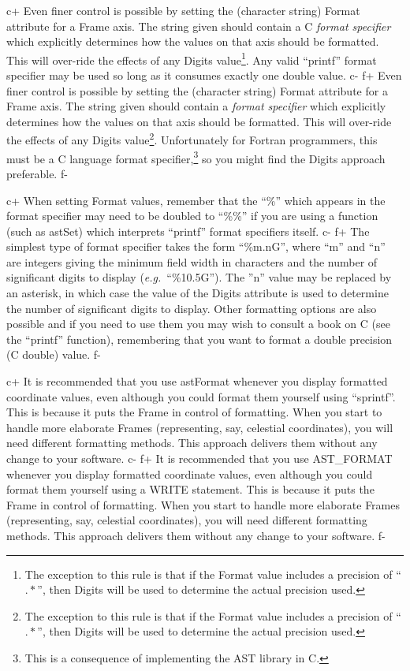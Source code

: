 \documentclass[twoside,11pt]{starlink}
\begin{document}
c+
Even finer control is possible by setting the (character string) Format
attribute for a Frame axis. The string given should contain a C
\emph{format specifier} which explicitly determines how the values on
that axis should be formatted. This will over-ride the effects of any
Digits value\footnote{The exception to this rule is that if the Format
value includes a precision of ``$.*$'', then Digits will be used to
determine the actual precision used.}. Any valid ``printf'' format
specifier may be used so long as it consumes exactly one double value.
c-
f+
Even finer control is possible by setting the (character string)
Format attribute for a Frame axis. The string given should contain a
\emph{format specifier} which explicitly determines how the values on
that axis should be formatted. This will over-ride the effects of any
Digits value\footnote{The exception to this rule is that if the Format value
includes a precision of ``$.*$'', then Digits will be used to determine
the actual precision used.}.  Unfortunately for Fortran programmers, this must
be a C language format specifier,\footnote{This is a consequence of
implementing the AST library in C.} so you might find the Digits
approach preferable.
f-

c+
When setting Format values, remember that the ``\%'' which appears in
the format specifier may need to be doubled to ``\%\%'' if you are
using a function (such as astSet) which interprets ``printf'' format
specifiers itself.
c-
f+
The simplest type of format specifier takes the form ``\%m.nG'', where
``m'' and ``n'' are integers giving the minimum field width in characters
and the number of significant digits to display (\emph{e.g.}\
``\%10.5G''). The ''n'' value may be replaced by an asterisk, in which
case the value of the Digits attribute is used to determine the number of
significant digits to display. Other formatting options are also possible
and if you need to use them you may wish to consult a book on C (see the
``printf'' function), remembering that you want to format a double
precision (C double) value.
f-

c+
It is recommended that you use astFormat whenever you display
formatted coordinate values, even although you could format them
yourself using ``sprintf''. This is because it puts the Frame in
control of formatting. When you start to handle more elaborate Frames
(representing, say, celestial coordinates), you will need different
formatting methods. This approach delivers them without any change to
your software.
c-
f+
It is recommended that you use AST\_FORMAT whenever you display
formatted coordinate values, even although you could format them
yourself using a WRITE statement. This is because it puts the Frame in
control of formatting. When you start to handle more elaborate Frames
(representing, say, celestial coordinates), you will need different
formatting methods. This approach delivers them without any change to
your software.
f-
\end{document}
